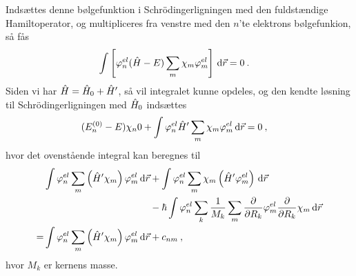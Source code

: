 Indsættes denne bølgefunktion i Schrödingerligningen med den fuldstændige Hamiltoperator, og multipliceres fra venstre med den $n$'te elektrons bølgefunkion, så fås
\begin{align}
    \int \left[\phi_n^{el} (\Hat{H} - E) \sum_m \chi_m\phi_m^{el}\right] \, \text{d}\Vec{r} &= 0 \: .
\end{align}
Siden vi har $\Hat{H} = \Hat{H}_0 + \Hat{H}'$, så vil integralet kunne opdeles, og den kendte løsning til Schrödingerligningen med $\Hat{H}_0$ indsættes
\begin{align}
    (E_n^{(0)} - E)\chi_n 0 + \int \phi_n^{el} \Hat{H}'\sum_m \chi_m\phi_m^{el} \, \text{d}\Vec{r} &= 0 \: ,
\end{align}
hvor det ovenstående integral kan beregnes til
\begin{align}
    &\int \phi_n^{el}\sum_m \left(\Hat{H}'\chi_m\right)\phi_m^{el} \, \text{d}\Vec{r} + \int \phi_n^{el}\sum_m \chi_m\left(\Hat{H}'\phi_m^{el}\right) \, \text{d}\Vec{r} \nonumber\\
    &\qquad \qquad \qquad \qquad \qquad \quad - \hbar \int \phi_n^{el} \sum_k \frac{1}{M_k} \sum_m \frac{\partial}{\partial R_k} \phi_m^{el} \frac{\partial}{\partial R_k} \chi_m \, \text{d}\Vec{r} \nonumber\\
    =& \int \phi_n^{el}\sum_m \left(\Hat{H}'\chi_m\right)\phi_m^{el} \, \text{d}\Vec{r} + c_{nm} \: ,
\end{align}
hvor $M_k$ er kernens masse.

